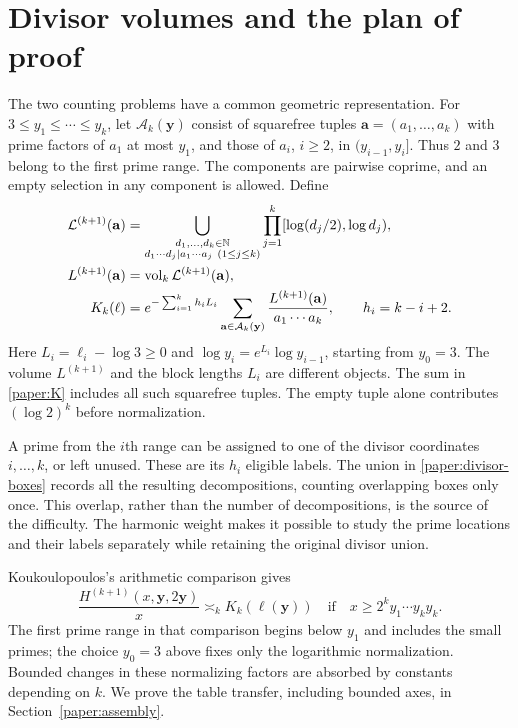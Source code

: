 \section{Divisor volumes and the plan of proof}
\label{paper:arithmetic-setup}

The two counting problems have a common geometric representation.
For $3\leq y_1\leq\cdots\leq y_k$, let $\mathcal A_k(\mathbf y)$
consist of squarefree tuples $\mathbf a=(a_1,\ldots,a_k)$ with prime
factors of $a_1$ at most $y_1$, and those of $a_i$, $i\geq2$, in
$(y_{i-1},y_i]$. Thus $2$ and $3$ belong to the first prime range.
The components are pairwise coprime, and an empty selection in any
component is allowed. Define
\begin{align}
\mathcal L^{(k+1)}(\mathbf a)
 &=\bigcup_{\substack{d_1,\ldots,d_k\in\mathbb N\\
       d_1\cdots d_j\mid a_1\cdots a_j\ (1\leq j\leq k)}}
       \prod_{j=1}^k[\log(d_j/2),\log d_j),\label{paper:divisor-boxes}\\
L^{(k+1)}(\mathbf a)&=\operatorname{vol}_k\mathcal L^{(k+1)}(\mathbf a),\notag\\
K_k(\ell)&=e^{-\sum_{i=1}^k h_iL_i}
       \sum_{\mathbf a\in\mathcal A_k(\mathbf y)}
       \frac{L^{(k+1)}(\mathbf a)}{a_1\cdots a_k},
       \qquad h_i=k-i+2.\label{paper:K}
\end{align}
Here $L_i=\ell_i-\log3\geq0$ and
$\log y_i=e^{L_i}\log y_{i-1}$, starting from $y_0=3$.
The volume $L^{(k+1)}$ and the block lengths $L_i$ are different objects.
The sum in \eqref{paper:K} includes all such squarefree tuples.
The empty tuple alone contributes $(\log2)^k$ before normalization.

A prime from the $i$th range can be assigned to one of the divisor
coordinates $i,\ldots,k$, or left unused. These are its $h_i$ eligible
labels. The union in \eqref{paper:divisor-boxes} records all the
resulting decompositions, counting overlapping boxes only once.
This overlap, rather than the number of decompositions, is the source
of the difficulty. The harmonic weight makes it possible to study the
prime locations and their labels separately while retaining the original
divisor union.

Koukoulopoulos's arithmetic comparison
\cite[Theorem~1.7]{Kouk} gives
\begin{equation}
\frac{H^{(k+1)}(x,\mathbf y,2\mathbf y)}x
 \asymp_k K_k(\ell(\mathbf y))
\quad\text{if}\quad
x\geq 2^k y_1\cdots y_k y_k.
\label{main:admissible}
\end{equation}
The first prime range in that comparison begins below $y_1$ and includes
the small primes; the choice $y_0=3$ above fixes only the logarithmic
normalization. Bounded changes in these normalizing factors are absorbed
by constants depending on $k$. We prove the table transfer, including
bounded axes, in Section~\ref{paper:assembly}.

